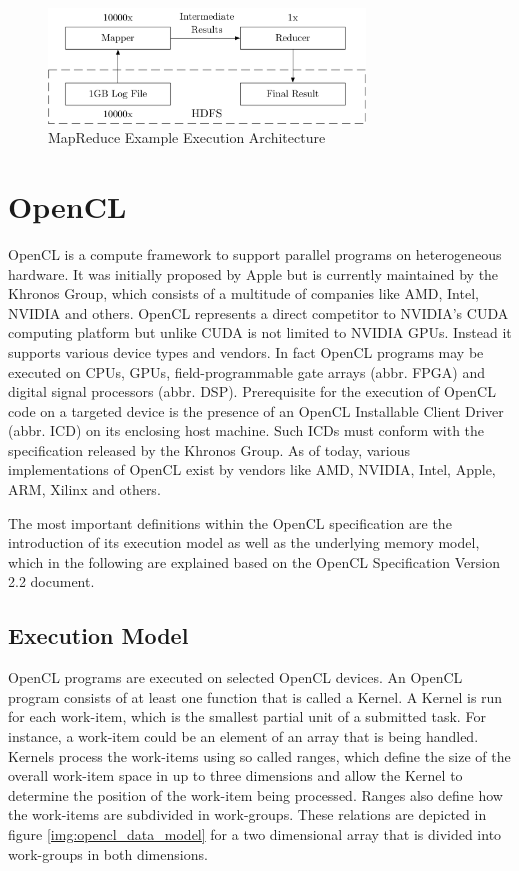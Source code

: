 \begin{figure}[!htb]
	\includegraphics[width=0.75\textwidth]{drawings/mapreduce_arch.pdf}
	\centering
	\caption{MapReduce Example Execution Architecture}
	\label{img:mapreduce_arch}
\end{figure}

\section{OpenCL}
\label{opencl}
OpenCL is a compute framework to support parallel programs on heterogeneous hardware. It was initially proposed by Apple but is currently maintained by the Khronos Group, which consists of a multitude of companies like AMD, Intel, NVIDIA and others\cite{opencl_directors}. OpenCL represents a direct competitor to NVIDIA's CUDA computing platform but unlike CUDA is not limited to NVIDIA GPUs. Instead it supports various device types and vendors. In fact OpenCL programs may be executed on CPUs, GPUs, field-programmable gate arrays (abbr. FPGA) and digital signal processors (abbr. DSP). Prerequisite for the execution of OpenCL code on a targeted device is the presence of an OpenCL Installable Client Driver (abbr. ICD) on its enclosing host machine. Such ICDs must conform with the specification released by the Khronos Group. As of today, various implementations of OpenCL exist by vendors like AMD, NVIDIA, Intel, Apple, ARM, Xilinx and others\cite{opencl_conform}.

The most important definitions within the OpenCL specification are the introduction of its execution model as well as the underlying memory model, which in the following are explained based on the OpenCL Specification Version 2.2 document\cite{opencl_spec}.

\subsection*{Execution Model}
OpenCL programs are executed on selected OpenCL devices. An OpenCL program consists of at least one function that is called a Kernel. A Kernel is run for each work-item, which is the smallest partial unit of a submitted task. For instance, a work-item could be an element of an array that is being handled. Kernels process the work-items using so called ranges, which define the size of the overall work-item space in up to three dimensions and allow the Kernel to determine the position of the work-item being processed. Ranges also define how the work-items are subdivided in work-groups. These relations are depicted in figure \ref{img:opencl_data_model} for a two dimensional array that is divided into work-groups in both dimensions.

